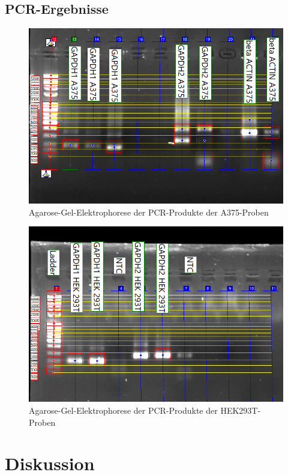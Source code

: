 \documentclass{article}
\begin{document}
\subsection*{PCR-Ergebnisse}

\begin{figure}[H]
    \centering
    \includegraphics[width=\textwidth]{images/gel/a375bp.png}
    \caption{Agarose-Gel-Elektrophorese der PCR-Produkte der A375-Proben}
    \label{fig:gela375}
\end{figure}
\begin{figure}[H]
    \centering
    \includegraphics[width=\textwidth]{images/gel/hek293T.png}
    \caption{Agarose-Gel-Elektrophorese der PCR-Produkte der HEK293T-Proben}
    \label{fig:gela375}
\end{figure}

\section{Diskussion}





\end{document}
